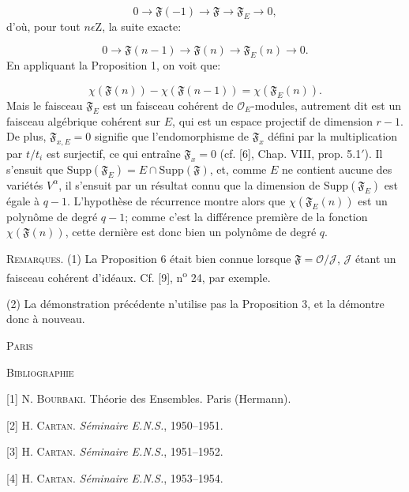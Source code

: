 \begin{equation*}
0 \to \mathfrak{F}(-1) \to \mathfrak{F} \to \mathfrak{F}_E \to 0,
\end{equation*}
d'où, pour tout $n \epsilon \mathrm{Z}$, la suite exacte:

\begin{equation*}
0 \to \mathfrak{F}(n - 1) \to \mathfrak{F}(n) \to \mathfrak{F}_E(n) \to 0.
\end{equation*}
En appliquant la Proposition 1, on voit que:

\begin{equation*}
\chi(\mathfrak{F}(n)) - \chi(\mathfrak{F}(n - 1)) = \chi(\mathfrak{F}_E(n)).
\end{equation*}
Mais le faisceau $\mathfrak{F}_E$ est un faisceau cohérent de $\mathcal{O}_E$-modules, autrement dit est un faisceau algébrique cohérent sur $E$, qui est un espace projectif de dimension $r - 1$. De plus, $\mathfrak{F}_{x,E} = 0$ signifie que l'endomorphisme de $\mathfrak{F}_x$ défini par la multiplication par $t/t_i$ est surjectif, ce qui entraîne $\mathfrak{F}_x = 0$ (cf. [6], Chap. VIII, prop. 5.1$'$). Il s'ensuit que $\mathrm{Supp}(\mathfrak{F}_E) = E \cap \mathrm{Supp}(\mathfrak{F})$, et, comme $E$ ne contient aucune des variétés $V^\alpha$, il s'ensuit par un résultat connu que la dimension de $\mathrm{Supp}(\mathfrak{F}_E)$ est égale à $q - 1$. L'hypothèse de récurrence montre alors que $\chi(\mathfrak{F}_E(n))$ est un polynôme de degré $q - 1$; comme c'est la différence première de la fonction $\chi(\mathfrak{F}(n))$, cette dernière est donc bien un polynôme de degré $q$.

\textsc{Remarques}. (1) La Proposition 6 était bien connue lorsque $\mathfrak{F} = \mathcal{O}/\mathcal{J}$, $\mathcal{J}$ étant un faisceau cohérent d'idéaux. Cf. [9], n\textsuperscript{o} 24, par exemple.

(2) La démonstration précédente n'utilise pas la Proposition 3, et la démontre donc à nouveau.


\textsc{Paris}


\textsc{Bibliographie}

[1] N. \textsc{Bourbaki}. Théorie des Ensembles. Paris (Hermann).

[2] H. \textsc{Cartan}. \textit{Séminaire E.N.S.}, 1950--1951.

[3] H. \textsc{Cartan}. \textit{Séminaire E.N.S.}, 1951--1952.

[4] H. \textsc{Cartan}. \textit{Séminaire E.N.S.}, 1953--1954.

